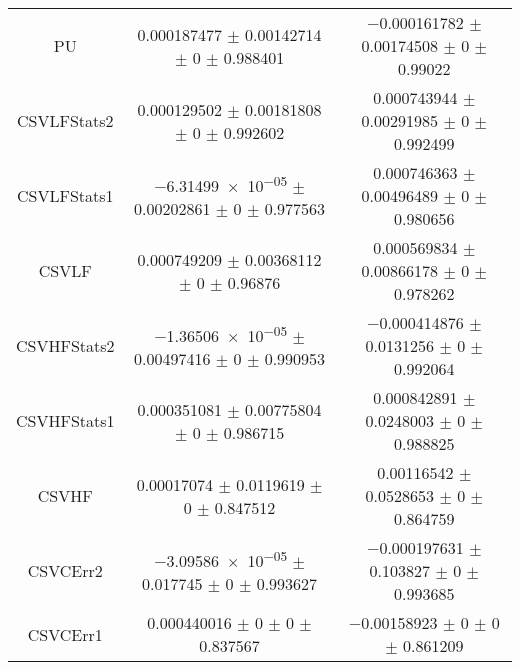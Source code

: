 \begin{table}
\begin{tabular}{ccc}
PU & \num{0.000187477} $\pm$ \num{0.00142714} $\pm$ \num{0} $\pm$ \num{0.988401} & \num{-0.000161782} $\pm$ \num{0.00174508} $\pm$ \num{0} $\pm$ \num{0.99022}\\
CSVLFStats2 & \num{0.000129502} $\pm$ \num{0.00181808} $\pm$ \num{0} $\pm$ \num{0.992602} & \num{0.000743944} $\pm$ \num{0.00291985} $\pm$ \num{0} $\pm$ \num{0.992499}\\
CSVLFStats1 & \num{-6.31499e-05} $\pm$ \num{0.00202861} $\pm$ \num{0} $\pm$ \num{0.977563} & \num{0.000746363} $\pm$ \num{0.00496489} $\pm$ \num{0} $\pm$ \num{0.980656}\\
CSVLF & \num{0.000749209} $\pm$ \num{0.00368112} $\pm$ \num{0} $\pm$ \num{0.96876} & \num{0.000569834} $\pm$ \num{0.00866178} $\pm$ \num{0} $\pm$ \num{0.978262}\\
CSVHFStats2 & \num{-1.36506e-05} $\pm$ \num{0.00497416} $\pm$ \num{0} $\pm$ \num{0.990953} & \num{-0.000414876} $\pm$ \num{0.0131256} $\pm$ \num{0} $\pm$ \num{0.992064}\\
CSVHFStats1 & \num{0.000351081} $\pm$ \num{0.00775804} $\pm$ \num{0} $\pm$ \num{0.986715} & \num{0.000842891} $\pm$ \num{0.0248003} $\pm$ \num{0} $\pm$ \num{0.988825}\\
CSVHF & \num{0.00017074} $\pm$ \num{0.0119619} $\pm$ \num{0} $\pm$ \num{0.847512} & \num{0.00116542} $\pm$ \num{0.0528653} $\pm$ \num{0} $\pm$ \num{0.864759}\\
CSVCErr2 & \num{-3.09586e-05} $\pm$ \num{0.017745} $\pm$ \num{0} $\pm$ \num{0.993627} & \num{-0.000197631} $\pm$ \num{0.103827} $\pm$ \num{0} $\pm$ \num{0.993685}\\
CSVCErr1 & \num{0.000440016} $\pm$ \num{0} $\pm$ \num{0} $\pm$ \num{0.837567} & \num{-0.00158923} $\pm$ \num{0} $\pm$ \num{0} $\pm$ \num{0.861209}\\
\bottomrule
\end{tabular}
\end{table}